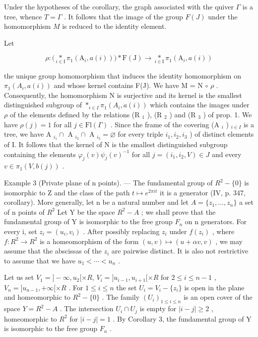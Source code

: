 Under the hypotheses of the corollary, the graph associated with the quiver \(\Gamma\) is a tree, whence \(T = \Gamma\) . It follows that the image of the group \(F(J)\) under the homomorphism \(M\) is reduced to the identity element.

Let

\[
\rho \colon \big (\underset {i \in \mathrm{I}} {\ast} \pi_ {1} (\mathrm{A} _ {i}, a (i)) \big) \ast \mathrm{F} (\mathrm{J}) \to \underset {i \in \mathrm{I}} {\ast} \pi_ {1} (\mathrm{A} _ {i}, a (i))
\]

the unique group homomorphism that induces the identity homomorphism on \(\pi_1(A_i, a(i))\) and whose kernel contains F(J). We have M = N \(\circ\) \(\rho\) . Consequently, the homomorphism N is surjective and its kernel is the smallest distinguished subgroup of \(*_{i \in I} \pi_1(A_i, a(i))\) which contains the images under \(\rho\) of the elements defined by the relations (R \(_1\) ), (R \(_2\) ) and (R \(_3\) ) of prop. 1. We have \(\rho(j) = 1\) for all \(j \in \text{Fl}(\Gamma)\) . Since the frame of the covering (A \(_i\) ) \(_{i \in I}\) is a tree, we have A \(_{i_1} \cap\) A \(_{i_2} \cap\) A \(_{i_3} = \varnothing\) for every triple \(i_1, i_2, i_3\) ) of distinct elements of I. It follows that the kernel of N is the smallest distinguished subgroup containing the elements \(\varphi_j(v) \psi_j(v)^{-1}\) for all \(j = (i_1, i_2, V) \in J\) and every \(v \in \pi_1(V, b(j))\) .

Example 3 (Private plane of n points). --- The fundamental group of \(R^{2}-\{0\}\) is isomorphic to Z and the class of the path \(t \mapsto e^{2\pi it}\) it is a generator (IV, p. 347, corollary). More generally, let n be a natural number and let \(A = \{z_{1}, \ldots, z_{n}\}\) a set of n points of \(R^{2}\) Let Y be the space \(R^{2}-A\) ; we shall prove that the fundamental group of Y is isomorphic to the free group \(F_{n}\) on n generators. For every i, set \(z_{i} = (u_{i}, v_{i})\) . After possibly replacing \(z_{i}\) under \(f(z_{i})\) , where \(f: R^{2} \to R^{2}\) is a homeomorphism of the form \((u, v) \mapsto (u + \alpha v, v)\) , we may assume that the abscissas of the \(z_{i}\) are pairwise distinct. It is also not restrictive to assume that we have \(u_{1} < \cdots < u_{n}\) .

Let us set \(V_{1} = ]-\infty, u_{2}[ \times R\), \(V_{i} = ]u_{i-1}, u_{i+1}[ \times R\) for \(2 \leqslant i \leqslant n-1\) , \(V_{n} = ]u_{n-1}, +\infty[ \times R\) . For \(1 \leqslant i \leqslant n\) the set \(U_{i} = V_{i} - \{z_{i}\}\) is open in the plane and homeomorphic to \(R^{2} - \{0\}\) . The family \((U_{i})_{1 \leqslant i \leqslant n}\) is an open cover of the space \(Y = R^{2} - A\) . The intersection \(U_{i} \cap U_{j}\) is empty for \(|i - j| \geqslant 2\) , homeomorphic to \(R^{2}\) for \(|i - j| = 1\) . By Corollary 3, the fundamental group of Y is isomorphic to the free group \(F_{n}\) .

